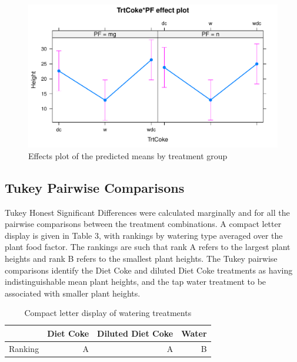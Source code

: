 \documentclass[1p,12pt]{elsarticle}\usepackage[]{graphicx}\usepackage[]{color}
\makeatletter
\def\maxwidth{ %
  \ifdim\Gin@nat@width>\linewidth
    \linewidth
  \else
    \Gin@nat@width
  \fi
}
\newenvironment{knitrout}{}{} %
\makeatother
\begin{document}
\begin{knitrout}
\color{fgcolor}\begin{figure}
\includegraphics[width=\maxwidth]{figure/model_-1} \caption[Effects plot of the predicted means by treatment group]{Effects plot of the predicted means by treatment group}\label{fig:model }
\end{figure}


\end{knitrout}


\subsection{Tukey Pairwise Comparisons}

Tukey Honest Significant Differences were calculated marginally and for all the pairwise comparisons between the treatment combinations. A compact letter display is given in Table 3, with rankings by watering type averaged over the plant food factor. The rankings are such that rank A refers to the largest plant heights and rank B refers to the smallest plant heights.  The Tukey pairwise comparisons identify the Diet Coke and diluted Diet Coke treatments as having indistinguishable mean plant heights, and the tap water treatment to be associated with smaller plant heights. 

\begin{table}[ht]
\centering
\begin{tabular}{lrrr}
  \hline
 & Diet Coke & Diluted Diet Coke & Water \\ 
  \hline
Ranking & A & A & B \\ 
  
   \hline
\end{tabular}
\caption{Compact letter display of watering treatments}
\end{table}
\end{document}
